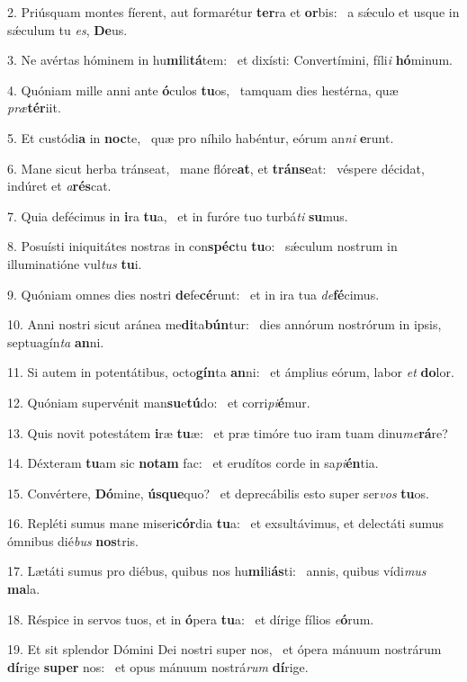 2. Priúsquam montes fíerent, aut formarétur \textbf{ter}ra et \textbf{or}bis: \ast\  a sǽculo et usque in sǽculum tu \textit{es}, \textbf{De}us.\

3. Ne avértas hóminem in hu\textbf{mi}li\textbf{tá}tem: \ast\  et dixísti: Convertímini, fíli\textit{i} \textbf{hó}minum.\

4. Quóniam mille anni ante \textbf{ó}culos \textbf{tu}os, \ast\  tamquam dies hestérna, quæ \textit{præ}\textbf{tér}iit.\

5. Et custódi\textbf{a} in \textbf{noc}te, \ast\  quæ pro níhilo habéntur, eórum an\textit{ni} \textbf{e}runt.\

6. Mane sicut herba tránseat, \dag\  mane flóre\textbf{at}, et \textbf{tráns}\textbf{e}at: \ast\  véspere décidat, indúret et \textit{a}\textbf{rés}cat.\

7. Quia defécimus in \textbf{i}ra \textbf{tu}a, \ast\  et in furóre tuo turbá\textit{ti} \textbf{su}mus.\

8. Posuísti iniquitátes nostras in con\textbf{spéc}tu \textbf{tu}o: \ast\  sǽculum nostrum in illuminatióne vul\textit{tus} \textbf{tu}i.\

9. Quóniam omnes dies nostri \textbf{de}fe\textbf{cé}runt: \ast\  et in ira tua \textit{de}\textbf{fé}cimus.\

10. Anni nostri sicut aránea me\textbf{di}ta\textbf{bún}tur: \ast\  dies annórum nostrórum in ipsis, septuagín\textit{ta} \textbf{an}ni.\

11. Si autem in potentátibus, octo\textbf{gín}ta \textbf{an}ni: \ast\  et ámplius eórum, labor \textit{et} \textbf{do}lor.\

12. Quóniam supervénit man\textbf{su}e\textbf{tú}do: \ast\  et corri\textit{pi}\textbf{é}mur.\

13. Quis novit potestátem \textbf{i}ræ \textbf{tu}æ: \ast\  et præ timóre tuo iram tuam dinu\textit{me}\textbf{rá}re?\

14. Déxteram \textbf{tu}am sic \textbf{no}\textbf{tam} fac: \ast\  et erudítos corde in sa\textit{pi}\textbf{én}tia.\

15. Convértere, \textbf{Dó}mine, \textbf{ús}\textbf{que}quo? \ast\  et deprecábilis esto super ser\textit{vos} \textbf{tu}os.\

16. Repléti sumus mane miseri\textbf{cór}dia \textbf{tu}a: \ast\  et exsultávimus, et delectáti sumus ómnibus dié\textit{bus} \textbf{nos}tris.\

17. Lætáti sumus pro diébus, quibus nos hu\textbf{mi}li\textbf{ás}ti: \ast\  annis, quibus vídi\textit{mus} \textbf{ma}la.\

18. Réspice in servos tuos, et in \textbf{ó}pera \textbf{tu}a: \ast\  et dírige fílios \textit{e}\textbf{ó}rum.\

19. Et sit splendor Dómini Dei nostri super nos, \dag\  et ópera mánuum nostrárum \textbf{dí}rige \textbf{su}\textbf{per} nos: \ast\  et opus mánuum nostrá\textit{rum} \textbf{dí}rige.\

